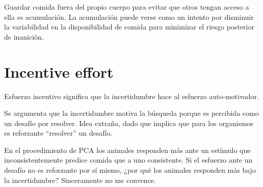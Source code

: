 \documentclass[a4paper,12pt]{article}
\begin{document}
Guardar comida fuera del propio cuerpo para evitar que otros tengan acceso a ella es acumulación.
La acumulación puede verse como un intento por disminuir la variabilidad en la disponibilidad de comida para minimizar el riesgo posterior de inanición.

\section{Incentive effort}

Esfuerzo incentivo significa que la incertidumbre hace al esfuerzo auto-motivador.

Se argumenta que la incertidumbre motiva la búsqueda porque es percibida como un desafío por resolver.
Idea extraña, dado que implica que para los organismos es reforzante ``resolver'' un desafío.

En el procedimiento de PCA los animales responden más ante un estímulo que inconsistentemente predice comida que a uno consistente.
Si el esfuerzo ante un desafío no es reforzante por sí mismo, ¿por qué los animales responden más bajo la incertidumbre? Sinceramente no me convence.
\end{document}
